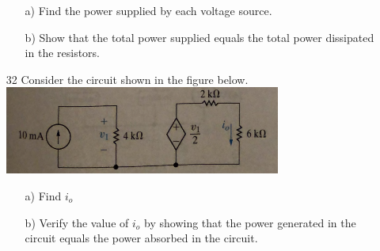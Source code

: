 \documentclass[a4paper]{article}
\begin{document}
\begin{itemize}
	      \begin{itemize}
	      	\item[a)] Find the power supplied by each voltage source.
	      	\item[b)] Show that the total power supplied equals the total power dissipated in the resistors. 
	      \end{itemize}
	\item[32] Consider the circuit shown in the figure below. \\
	      \includegraphics{P2-32.png} \\	  
	      \begin{itemize}
	      	\item[a)] Find $i_{o}$
	      	\item[b)] Verify the value of $i_{o}$ by showing that the power generated in the circuit equals the power absorbed in the circuit. 
	      \end{itemize}  
\end{itemize}

  
\end{document}
